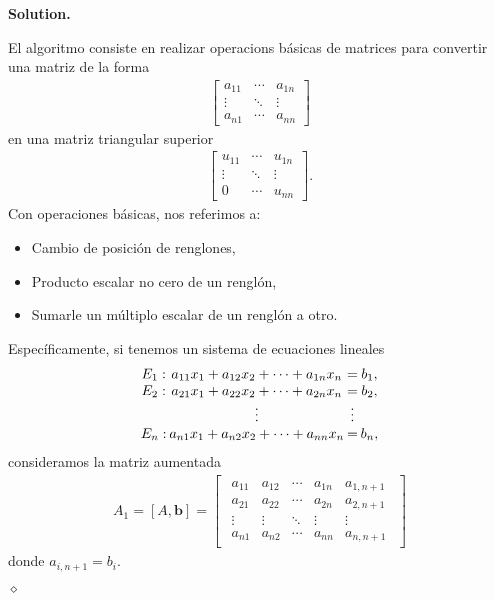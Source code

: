 \documentclass{article}
\theoremstyle{problemstyle}
\newenvironment{solution}{%
  \begin{mdframed}[linewidth=0.8pt,linecolor=Gray,backgroundcolor=Gray!5,roundcorner=5pt]%
  \noindent\textbf{Solution.}%
}{%
\hfill $ \diamond $ 
  \end{mdframed}%
}
\begin{document}
\begin{solution}
	El algoritmo consiste en realizar operacions b\'asicas de matrices para convertir una matriz de la forma
	\begin{align*}
		\begin{bmatrix}
			a_{11} & \cdots & a_{1n} \\
			\vdots & \ddots & \vdots \\
			a_{n1} & \cdots & a_{nn}
		\end{bmatrix}
	\end{align*}
	en una matriz triangular superior
	\begin{align*}
		\begin{bmatrix}
			u_{11} & \cdots & u_{1n} \\
			\vdots & \ddots & \vdots \\
			0      & \cdots & u_{nn}
		\end{bmatrix}.
	\end{align*}
	Con operaciones b\'asicas, nos referimos a:
	\begin{itemize}
		\item Cambio de posici\'on de renglones,
		\item Producto escalar no cero de un rengl\'on,
		\item Sumarle un m\'ultiplo escalar de un rengl\'on a otro.
	\end{itemize}
	Espec\'ificamente, si tenemos un sistema de ecuaciones lineales
	\begin{align*}
    \arraycolsep=1pt
		\begin{array}{cccc}
      E_{1} : & a_{11}x_{1} + a_{12}x_{2} + \cdots + a_{1n}x_{n} &=& b_{1}, \\
      E_{2} : & a_{21}x_{1} + a_{22}x_{2} + \cdots + a_{2n}x_{n} &=& b_{2}, \\
              & \vdots & \vdots&                                                    \\
      E_{n} : & a_{n1}x_{1} + a_{n2}x_{2} + \cdots + a_{nn}x_{n} &=& b_{n},
		\end{array}
	\end{align*}
	consideramos la matriz aumentada
	\begin{align*}
		A_1 = [A,\mathbf{b}] =
		\begin{bmatrix}
			\begin{array}{cccc|c}
				a_{11} & a_{12} & \cdots & a_{1n} & a_{1,n+1} \\
				a_{21} & a_{22} & \cdots & a_{2n} & a_{2,n+1} \\
				\vdots & \vdots & \ddots & \vdots & \vdots    \\
				a_{n1} & a_{n2} & \cdots & a_{nn} & a_{n,n+1}
			\end{array}
		\end{bmatrix}
	\end{align*}
	donde $ a_{i, n+1} = b_{i} $.


\end{solution}
\end{document}
